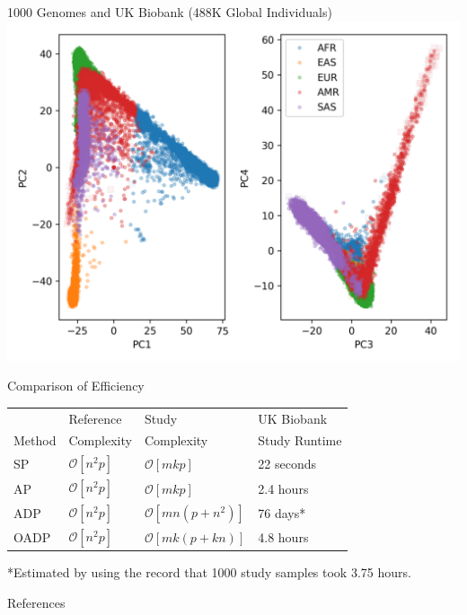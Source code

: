 \documentclass{beamer}
\newcommand{\bO}{\mathcal{O}}
\begin{document}
\begin{frame}{1000 Genomes and UK Biobank (488K Global Individuals)}
\includegraphics[height=0.9\textheight]{ukb_snps_kgn.png}
\end{frame}


\begin{frame}{Comparison of Efficiency}
\begin{table} 
  \centering
  \begin{tabular}{|l|l|l|l|}
    \hline
    & Reference & Study & UK Biobank \\
    Method & Complexity & Complexity & Study Runtime \\ 
    \hline
    SP & $\bO[n^2p]$ & $\bO[mkp]$ & 22 seconds \\
    \hline
    AP & $\bO[n^2p]$ &  $\bO[mkp]$ & 2.4 hours \\
    \hline
    ADP & $\bO[n^2 p]$ & $\bO[mn(p + n^2)]$ & 76 days* \\
    \hline
    OADP & $\bO[n^2 p]$ & $\bO[mk(p + k n)]$ & 4.8 hours \\
    \hline
  \end{tabular}
\end{table}

*Estimated by using the record that 1000 study samples took 3.75 hours.
\end{frame}


\begin{frame}{References}
    
    
\end{frame}
\end{document}
